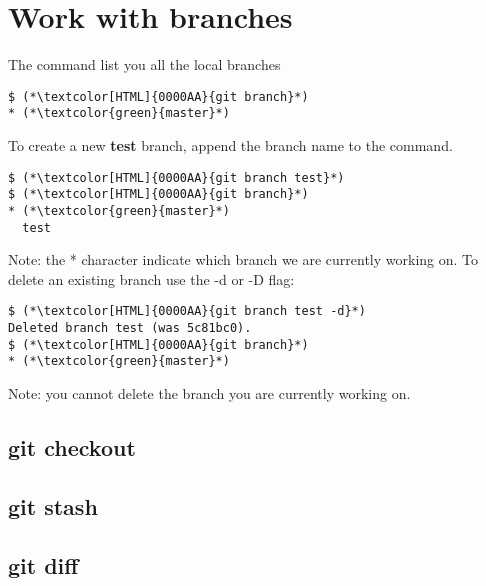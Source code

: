 \section{Work with branches}
\begin{frame}[fragile]
    \slidetitle
The  command list you all the local branches
\begin{lstlisting}
$ (*\textcolor[HTML]{0000AA}{git branch}*)
* (*\textcolor{green}{master}*)
\end{lstlisting}

To create a new \textbf{test} branch, append the branch name to the command.
\begin{lstlisting}
$ (*\textcolor[HTML]{0000AA}{git branch test}*)
$ (*\textcolor[HTML]{0000AA}{git branch}*)
* (*\textcolor{green}{master}*)
  test
\end{lstlisting}

Note: the * character indicate which branch we are currently working on.
\newline
To delete an existing branch use the -d or -D flag:
\begin{lstlisting}
$ (*\textcolor[HTML]{0000AA}{git branch test -d}*)
Deleted branch test (was 5c81bc0).
$ (*\textcolor[HTML]{0000AA}{git branch}*)
* (*\textcolor{green}{master}*)
\end{lstlisting}
\end{frame}

Note: you cannot delete the branch you are currently working on.

\subsection{git checkout}
\begin{frame}[fragile]
    \subslidetitle
\end{frame}

\subsection{git stash}
\begin{frame}[fragile]
    \subslidetitle
\end{frame}

\subsection{git diff}
\begin{frame}[fragile]
    \subslidetitle
\end{frame}

